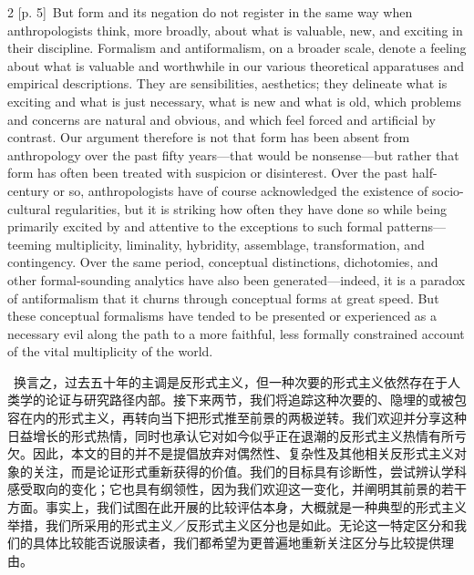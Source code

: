 \documentclass[10pt,a4paper]{article}
\begin{document}
\begin{paracol}{2}
{\scriptsize\color{gray} [p. 5]}\ But form and its negation do not register in the same way when anthropologists think, more broadly, about what is valuable, new, and exciting in their discipline. Formalism and antiformalism, on a broader scale, denote a feeling about what is valuable and worthwhile in our various theoretical apparatuses and empirical descriptions. They are sensibilities, aesthetics; they delineate what is exciting and what is just necessary, what is new and what is old, which problems and concerns are natural and obvious, and which feel forced and artificial by contrast. Our argument therefore is not that form has been absent from anthropology over the past fifty years—that would be nonsense—but rather that form has often been treated with suspicion or disinterest. Over the past half-century or so, anthropologists have of course acknowledged the existence of socio-cultural regularities, but it is striking how often they have done so while being primarily excited by and attentive to the exceptions to such formal patterns—teeming multiplicity, liminality, hybridity, assemblage, transformation, and contingency. Over the same period, conceptual distinctions, dichotomies, and other formal-sounding analytics have also been generated—indeed, it is a paradox of antiformalism that it churns through conceptual forms at great speed. But these conceptual formalisms have tended to be presented or experienced as a necessary evil along the path to a more faithful, less formally constrained account of the vital multiplicity of the world.\par
\switchcolumn*
{\scriptsize\color{gray} [p. 5]}\ 换言之，过去五十年的主调是反形式主义，但一种次要的形式主义依然存在于人类学的论证与研究路径内部。接下来两节，我们将追踪这种次要的、隐埋的或被包容在内的形式主义，再转向当下把形式推至前景的两极逆转。我们欢迎并分享这种日益增长的形式热情，同时也承认它对如今似乎正在退潮的反形式主义热情有所亏欠。因此，本文的目的并不是提倡放弃对偶然性、复杂性及其他相关反形式主义对象的关注，而是论证形式重新获得的价值。我们的目标具有诊断性，尝试辨认学科感受取向的变化；它也具有纲领性，因为我们欢迎这一变化，并阐明其前景的若干方面。事实上，我们试图在此开展的比较评估本身，大概就是一种典型的形式主义举措，我们所采用的形式主义／反形式主义区分也是如此。无论这一特定区分和我们的具体比较能否说服读者，我们都希望为更普遍地重新关注区分与比较提供理由。\par
\switchcolumn

\end{paracol}
\end{document}
